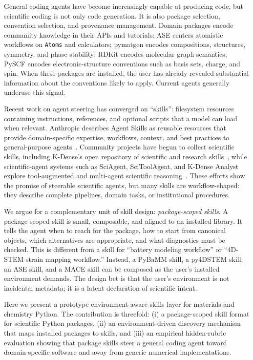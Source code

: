 \documentclass[11pt]{article}
\begin{document}
General coding agents have become increasingly capable at producing code, but scientific coding is not only code generation. It is also package selection, convention selection, and provenance management. Domain packages encode community knowledge in their APIs and tutorials: ASE centers atomistic workflows on \texttt{Atoms} and calculators; pymatgen encodes compositions, structures, symmetry, and phase stability; RDKit encodes molecular graph semantics; PySCF encodes electronic-structure conventions such as basis sets, charge, and spin. When these packages are installed, the user has already revealed substantial information about the conventions likely to apply. Current agents generally underuse this signal.

Recent work on agent steering has converged on ``skills'': filesystem resources containing instructions, references, and optional scripts that a model can load when relevant. Anthropic describes Agent Skills as reusable resources that provide domain-specific expertise, workflows, context, and best practices to general-purpose agents~\cite{anthropic-agent-skills-docs,anthropic-skills-blog,anthropic-skills-explained}. Community projects have begun to collect scientific skills, including K-Dense's open repository of scientific and research skills~\cite{kdense-skills}, while scientific-agent systems such as SciAgent, SciToolAgent, and K-Dense Analyst explore tool-augmented and multi-agent scientific reasoning~\cite{sciagent-2024,scitoolagent-2025,kdense-analyst-2025}. These efforts show the promise of steerable scientific agents, but many skills are workflow-shaped: they describe complete pipelines, domain tasks, or institutional procedures.

We argue for a complementary unit of skill design: \emph{package-scoped skills}. A package-scoped skill is small, composable, and aligned to an installed library. It tells the agent when to reach for the package, how to start from canonical objects, which alternatives are appropriate, and what diagnostics must be checked. This is different from a skill for ``battery modeling workflow'' or ``4D-STEM strain mapping workflow.'' Instead, a PyBaMM skill, a py4DSTEM skill, an ASE skill, and a MACE skill can be composed as the user's installed environment demands. The design bet is that the user's environment is not incidental metadata; it is a latent declaration of scientific intent.

Here we present a prototype environment-aware skills layer for materials and chemistry Python. The contribution is threefold: (i) a package-scoped skill format for scientific Python packages, (ii) an environment-driven discovery mechanism that maps installed packages to skills, and (iii) an empirical hidden-rubric evaluation showing that package skills steer a general coding agent toward domain-specific software and away from generic numerical implementations.
\end{document}
